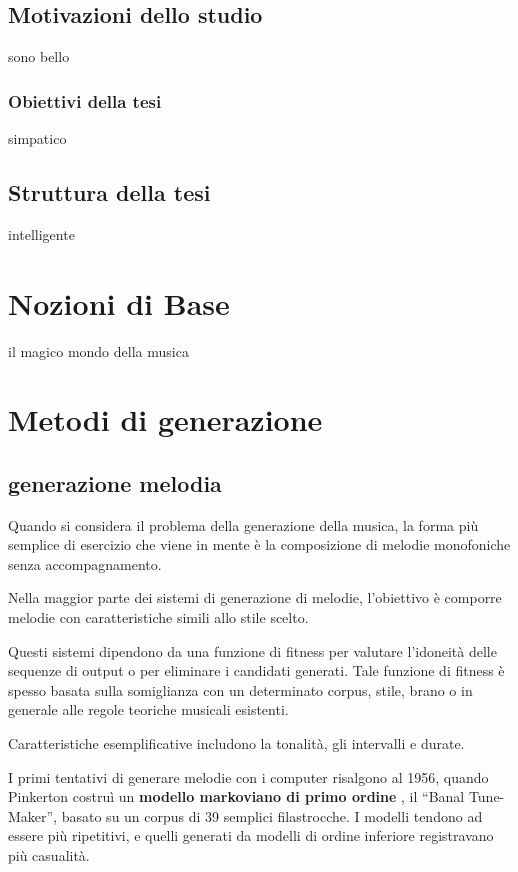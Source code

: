 \documentclass[a4paper,12pt]{report}
\begin{document}
\section{Motivazioni dello studio}

sono bello

\subsection{Obiettivi della tesi}

simpatico 

\section{Struttura della tesi}

intelligente

\chapter{Nozioni di Base}

il magico mondo della musica

\chapter{Metodi di generazione}
\section{generazione melodia}


Quando si considera il problema della generazione della musica, la forma più semplice di esercizio che viene in mente è la composizione di melodie monofoniche senza accompagnamento.

Nella maggior parte dei sistemi di generazione di melodie, l'obiettivo è comporre melodie con caratteristiche simili allo stile scelto.

Questi sistemi dipendono da una funzione di fitness per valutare l'idoneità delle sequenze di output o per eliminare i candidati generati. 
Tale funzione di fitness è spesso basata sulla somiglianza con un determinato corpus, stile, brano o in generale alle regole teoriche musicali esistenti.

Caratteristiche esemplificative includono la tonalità, gli intervalli e durate.

I primi tentativi di generare melodie con i computer risalgono al 1956, quando Pinkerton costruì un \textbf{modello markoviano di primo ordine} , il “Banal Tune-Maker”, basato su un corpus di 39 semplici filastrocche.
I modelli tendono ad essere più ripetitivi, e quelli generati da modelli di ordine inferiore registravano più casualità.
\end{document}
